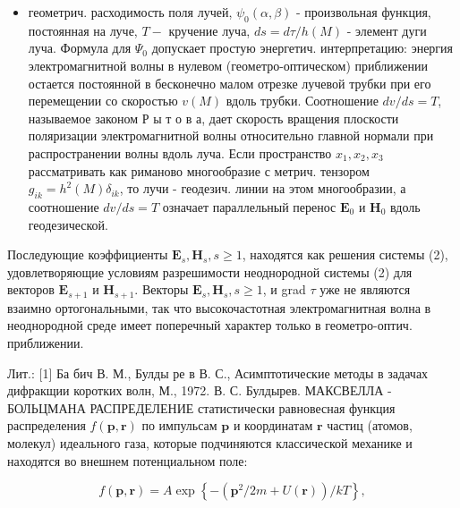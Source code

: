 \documentclass[10pt]{article}
\begin{document}
\begin{itemize}

  \item геометрич. расходимость поля лучей, $\psi_{0}(\alpha, \beta)$ - произвольная функция, постоянная на луче, $T-$ кручение луча, $d s=d \tau / h(M)$ - элемент дуги луча. Формула для $\Psi_{0}$ допускает простую энергетич. интерпретацию: энергия электромагнитной волны в нулевом (геометро-оптическом) приближении остается постоянной в бесконечно малом отрезке лучевой трубки при его перемещении со скоростью $v(M)$ вдоль трубки. Соотношение $d v / d s=T$, называемое законом Р ы т о в а, дает скорость вращения плоскости поляризации электромагнитной волны относительно главной нормали при распространении волны вдоль луча. Если пространство $x_{1}, x_{2}, x_{3}$ рассматривать как риманово многообразие с метрич. тензором $g_{i k}=h^{2}(M) \delta_{i k}$, то лучи - геодезич. линии на этом многообразии, а соотношение $d v / d s=T$ означает параллельный перенос $\boldsymbol{E}_{0}$ и $\boldsymbol{H}_{0}$ вдоль геодезической.

\end{itemize}



Последующие коэффициенты $\boldsymbol{E}_{s}, \boldsymbol{H}_{s}, s \geqslant 1$, находятся как решения системы (2), удовлетворяющие условиям разрешимости неоднородной системы (2) для векторов $\boldsymbol{E}_{s+1}$ и $\boldsymbol{H}_{s+1}$. Векторы $\boldsymbol{E}_{s}, \boldsymbol{H}_{s}, s \geqslant 1$, и grad $\tau$ уже не являются взаимно ортогональными, так что высокочастотная электромагнитная волна в неоднородной среде имеет поперечный характер только в геометро-оптич. приближении.



Лит.: [1] Ба бич В. М., Булды ре в В. С., Асимптотические методы в задачах дифракщии коротких волн, М., 1972. В. С. Булдырев. МАКСВЕЛЛА - БОЛЬЦМАНА РАСПРЕДЕЛЕНИЕ статистически равновесная функция распределения $f(\boldsymbol{p}, \boldsymbol{r})$ по импульсам $\boldsymbol{p}$ и координатам $\boldsymbol{r}$ частиц (атомов, молекул) идеального газа, которые подчиняются классической механике и находятся во внешнем потенциальном поле:



\[

f(\boldsymbol{p}, \boldsymbol{r})=A \exp \left\{-\left(\boldsymbol{p}^{2} / 2 m+U(\boldsymbol{r})\right) / k T\right\},

\]
\end{document}
